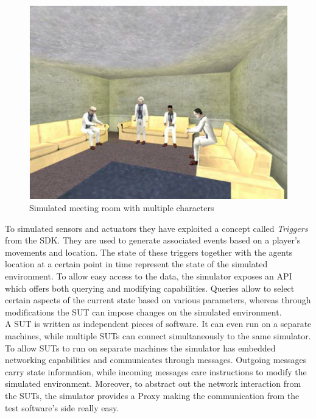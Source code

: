 \begin{figure}[H]
	\centering
	\includegraphics[width=\linewidth]{gfx/Chapter2/tatus_simulated_meeting_room}
	\caption{Simulated meeting room with multiple characters}
	\label{fig:tatus_simulated_meeting_room}
\end{figure}

To simulated sensors and actuators they have exploited a concept called \emph{Triggers} from the SDK. They are used to generate associated events based on a player's movements and location. The state of these triggers together with the agents location at a certain point in time represent the state of the simulated environment. To allow easy access to the data, the simulator exposes an API which offers both querying and modifying capabilities. Queries allow to select certain aspects of the current state based on various parameters, whereas through modifications the SUT can impose changes on the simulated environment.\\

A SUT is written as independent pieces of software. It can even run on a separate machines, while multiple SUTs can connect simultaneously to the same simulator. To allow SUTs to run on separate machines the simulator has embedded networking capabilities and communicates through messages. Outgoing messages carry state information, while incoming messages care instructions to modify the simulated environment. Moreover, to abstract out the network interaction from the SUTs, the simulator provides a Proxy making the communication from the test software's side really easy.\\

